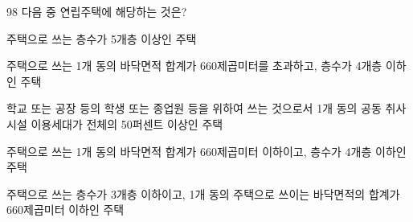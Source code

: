 \begin{question}{98}
다음 중 연립주택에 해당하는 것은?
\begin{choices}
  \item 주택으로 쓰는 층수가 5개층 이상인 주택
  \item 주택으로 쓰는 1개 동의 바닥면적 합계가 660제곱미터를 초과하고, 층수가 4개층 이하인 주택
  \item 학교 또는 공장 등의 학생 또는 종업원 등을 위하여 쓰는 것으로서 1개 동의 공동 취사시설 이용세대가 전체의 50퍼센트 이상인 주택
  \item 주택으로 쓰는 1개 동의 바닥면적 합계가 660제곱미터 이하이고, 층수가 4개층 이하인 주택
  \item 주택으로 쓰는 층수가 3개층 이하이고, 1개 동의 주택으로 쓰이는 바닥면적의 합계가 660제곱미터 이하인 주택
\end{choices}
\end{question}
